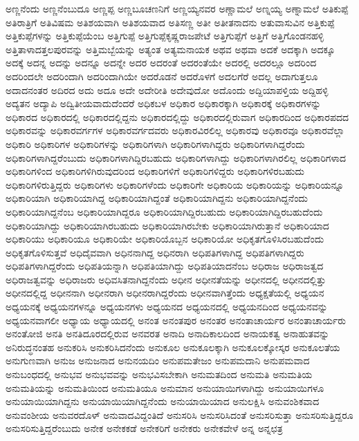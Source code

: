 {ಅಣ್ಣನೆಂದು
ಅಣ್ಣನೆಂಬುದೂ
ಅಣ್ಣಪ್ಪ
ಅಣ್ಣಬೂಚಣನಿಗೆ
ಅಣ್ಣಯ್ಯನವರ
ಅಣ್ಣಾಮಲೆ
ಅಣ್ನಯ್ಯ
ಅಣ್ನಾಮಲೆ
ಅತಿಕುಪ್ಪೆ
ಅತಿರಾತ್ರಿಗೆ
ಅತಿವಿಷಮ
ಅತಿಶಯವಾಗಿ
ಅತಿಶಯವಾದ
ಅತಿಸಣ್ಣ
ಅತೀ
ಅತೀತನಾದನು
ಅತುವಾಸುವಿನ
ಅತ್ತಿಕುಪ್ಪೆ
ಅತ್ತಿಕುಪ್ಪೆಗಳನ್ನು
ಅತ್ತಿಕುಪ್ಪೆಯೆಂಬ
ಅತ್ತಿಗುಪ್ಪೆ
ಅತ್ತಿಗುಪ್ಪೆಕೃಷ್ಣರಾಜಪೇಟೆ
ಅತ್ತಿಗುಪ್ಪೆಗೆ
ಅತ್ತಿಗೆ
ಅತ್ತಿಗೊಂಡನಹಳ್ಳಿ
ಅತ್ತಿತಾಳಾದತ್ತಲಪುರವನ್ನು
ಅತ್ತಿಮಬ್ಬೆಯನ್ನು
ಅತ್ಯಂತ
ಅತ್ಯಮನಾಯಕ
ಅಥವ
ಅಥವಾ
ಅದಕೆ
ಅದಕ್ಕಾಗಿ
ಅದಕ್ಕೂ
ಅದಕ್ಕೆ
ಅದನ್ನ
ಅದನ್ನು
ಅದನ್ನೂ
ಅದನ್ನೇ
ಅದರ
ಅದರಂತೆ
ಅದರಂತೆಯೇ
ಅದರಲ್ಲಿ
ಅದರಲ್ಲೂ
ಅದರಿಂದ
ಅದರಿಂದಲೇ
ಅದರಿಂದಾಗಿ
ಅದರಿಂದಾಗಿಯೇ
ಅದರೊಡನೆ
ಅದರೊಳಗೆ
ಅದಲಗೆರೆ
ಅದಲ್ಲ
ಅದಾಗುತ್ತಲೂ
ಅದಾದನಂತರ
ಅದಿರದ
ಅದು
ಅದೂ
ಅದೇ
ಅದೇರೀತಿ
ಅದೇವುದೋ
ಅದೊಂದು
ಅದ್ದಿಯಾಪಳ್ತಿಯ
ಅದ್ದಿಹಳ್ಳಿ
ಅದ್ಯತನ
ಅದ್ಯಾಪಿ
ಅದ್ವಿತೀಯವಾದುದೆಂದರೆ
ಅಧಿಕಬಳ
ಅಧಿಕಾರ
ಅಧಿಕಾರಕ್ಕಾಗಿ
ಅಧಿಕಾರಕ್ಕೆ
ಅಧಿಕಾರಗಳನ್ನು
ಅಧಿಕಾರದ
ಅಧಿಕಾರದಲ್ಲಿ
ಅಧಿಕಾರದಲ್ಲಿದ್ದನು
ಅಧಿಕಾರದಲ್ಲಿದ್ದು
ಅಧಿಕಾರದಲ್ಲಿರುವಾಗ
ಅಧಿಕಾರದಿಂದ
ಅಧಿಕಾರಪದದ
ಅಧಿಕಾರವನ್ನು
ಅಧಿಕಾರವರ್ಗಗಳ
ಅಧಿಕಾರವರ್ಗದವರು
ಅಧಿಕಾರವಿರಲಿಲ್ಲ
ಅಧಿಕಾರವು
ಅಧಿಕಾರವೂ
ಅಧಿಕಾರವೆಲ್ಲಾ
ಅಧಿಕಾರಿ
ಅಧಿಕಾರಿಗಳ
ಅಧಿಕಾರಿಗಳನ್ನು
ಅಧಿಕಾರಿಗಳಾಗಿ
ಅಧಿಕಾರಿಗಳಾಗಿದ್ದರು
ಅಧಿಕಾರಿಗಳಾಗಿದ್ದರೆಂದು
ಅಧಿಕಾರಿಗಳಾಗಿದ್ದರೆಂಬುದು
ಅಧಿಕಾರಿಗಳಾಗಿದ್ದಿರಬಹುದು
ಅಧಿಕಾರಿಗಳಾಗಿದ್ದು
ಅಧಿಕಾರಿಗಳಾಗಿರಲಿಲ್ಲ
ಅಧಿಕಾರಿಗಳಾದ
ಅಧಿಕಾರಿಗಳಿಂದ
ಅಧಿಕಾರಿಗಳಿಗಿರುವುದರಿಂದ
ಅಧಿಕಾರಿಗಳಿಗೆ
ಅಧಿಕಾರಿಗಳಿದ್ದರು
ಅಧಿಕಾರಿಗಳಿರಬಹುದು
ಅಧಿಕಾರಿಗಳಿರುತ್ತಿದ್ದರು
ಅಧಿಕಾರಿಗಳು
ಅಧಿಕಾರಿಗಳೆಂದು
ಅಧಿಕಾರಿಗೇ
ಅಧಿಕಾರಿಯ
ಅಧಿಕಾರಿಯನ್ನು
ಅಧಿಕಾರಿಯನ್ನೂ
ಅಧಿಕಾರಿಯಾಗಿ
ಅಧಿಕಾರಿಯಾಗಿದ್ದ
ಅಧಿಕಾರಿಯಾಗಿದ್ದಂತೆ
ಅಧಿಕಾರಿಯಾಗಿದ್ದನು
ಅಧಿಕಾರಿಯಾಗಿದ್ದನೆಂದು
ಅಧಿಕಾರಿಯಾಗಿದ್ದನೆಂಬ
ಅಧಿಕಾರಿಯಾಗಿದ್ದರೂ
ಅಧಿಕಾರಿಯಾಗಿದ್ದಿರಬಹುದು
ಅಧಿಕಾರಿಯಾಗಿದ್ದಿರಬಹುದೆಂದು
ಅಧಿಕಾರಿಯಾಗಿದ್ದು
ಅಧಿಕಾರಿಯಾಗಿರಬಹುದು
ಅಧಿಕಾರಿಯಾಗಿರಬೇಕು
ಅಧಿಕಾರಿಯಾಗಿರುತ್ತಾನೆ
ಅಧಿಕಾರಿಯಾದ
ಅಧಿಕಾರಿಯು
ಅಧಿಕಾರಿಯೂ
ಅಧಿಕಾರಿಯೇ
ಅಧಿಕಾರಿಯೊಬ್ಬನ
ಅಧಿಕಾರಿಯೋ
ಅಧಿಕೃತಗೊಳಿಸಿರಬಹುದೆಂದು
ಅಧಿಕೃತಗೊಳಿಸುತ್ತವೆ
ಅಧಿದೈವವಾಗಿ
ಅಧಿನನಾಗಿದ್ದ
ಅಧಿನರಾಗಿ
ಅಧಿಪತಿಗಳಾಗಿದ್ದ
ಅಧಿಪತಿಗಳಾಗಿದ್ದರು
ಅಧಿಪತಿಗಳಾಗಿದ್ದರೆಂದು
ಅಧಿಪತಿಯನ್ನಾಗಿ
ಅಧಿಪತಿಯಾಗಿದ್ದು
ಅಧಿಪತಿಯಾದನೆಂಬ
ಅಧಿರಾಜ
ಅಧಿರಾಜತ್ವದ
ಅಧಿರಾಜತ್ವವನ್ನು
ಅಧಿರಾಜರು
ಅಧಿವಸಿತನಾಗಿದ್ದನೆಂದು
ಅಧೀನ
ಅಧೀನತೆಯನ್ನು
ಅಧೀನದಲ್ಲಿ
ಅಧೀನದಲ್ಲಿತ್ತು
ಅಧೀನದಲ್ಲಿದ್ದ
ಅಧೀನನಾಗಿ
ಅಧೀನರಾಗಿ
ಅಧೀನರಾಗಿದ್ದರೆಂದು
ಅಧೀನವಾಗಿತ್ತೆಂದು
ಅಧ್ಯಕ್ಷತೆಯಲ್ಲಿ
ಅಧ್ಯಯನ
ಅಧ್ಯಯನಕ್ಕೆ
ಅಧ್ಯಯನಗಳನ್ನೂ
ಅಧ್ಯಯನಗಳು
ಅಧ್ಯಯನದ
ಅಧ್ಯಯನದಲ್ಲಿ
ಅಧ್ಯಯನದಿಂದ
ಅಧ್ಯಯನವನ್ನು
ಅಧ್ಯಯನವಾಗಲೀ
ಅಧ್ಯಾಯ
ಅಧ್ಯಾಯದಲ್ಲಿ
ಅನಂತ
ಅನಂತಪುರ
ಅನಂತರ
ಅನಂತಾಚಾರ್ಯರ
ಅನಂತಾಚಾರ್ಯರು
ಅನಂತೋಜಿ
ಅನತಿ
ಅನತಿದೂರದಲ್ಲಿರುವ
ಅನವರತ
ಅನಾದಿ
ಅನಾದಿಕಾಲದಿಂದ
ಅನಾಯಕತ್ವ
ಅನಾಹುತವನ್ನು
ಅನಿರುದ್ಧನಂತಹ
ಅನುಕರಿಸಿ
ಅನುಕರಿಸಿದನೆಂದು
ಅನುಕೂಲ
ಅನುಕೂಲಕ್ಕಾಗಿ
ಅನುಕೂಲಕ್ಕೋಸ್ಕರ
ಅನುಕೂಲತೆಯ
ಅನುಗುಣವಾಗಿ
ಅನುಜ
ಅನುಜನಾದ
ಅನುನಯದಿಂ
ಅನುಪಮತೇಜಂ
ಅನುಪಮದಾನಿ
ಅನುಪಮವಾದ
ಅನುಬಂಧದಲ್ಲಿ
ಅನುಭವ
ಅನುಭವವನ್ನು
ಅನುಭವಿಸಬೇಕಾಗಿ
ಅನುಮತದಿಂದ
ಅನುಮತಿ
ಅನುಮತಿಯ
ಅನುಮತಿಯನ್ನು
ಅನುಮತಿಯಿಂದ
ಅನುಮತಿಯೂ
ಅನುಮಾನ
ಅನುಯಾಯಿಗಳಾಗಿದ್ದು
ಅನುಯಾಯಿಗಳೂ
ಅನುಯಾಯಿಯಾಗಿದ್ದನು
ಅನುಯಾಯಿಯಾಗಿದ್ದನೆಂದು
ಅನುಯಾಯಿಯಾದ
ಅನುಲಕ್ಷಿಸಿ
ಅನುವಂಶಿಕವಾದ
ಅನುವಂಶೀಯ
ಅನುವರದೊಳ್
ಅನುವಾದವಿದ್ದಂತಿದೆ
ಅನುಸರಿಸಿ
ಅನುಸರಿಸಿದಂತೆ
ಅನುಸರಿಸುತ್ತಾ
ಅನುಸರಿಸುತ್ತಿದ್ದರೂ
ಅನುಸರಿಸುತ್ತಿದ್ದರೆಂಬುದು
ಅನೇಕ
ಅನೇಕಕಡೆ
ಅನೇಕರಿಗೆ
ಅನೇಕರು
ಅನೇಕವೇಳೆ
ಅನ್ನ
ಅನ್ನಛತ್ರ
}
